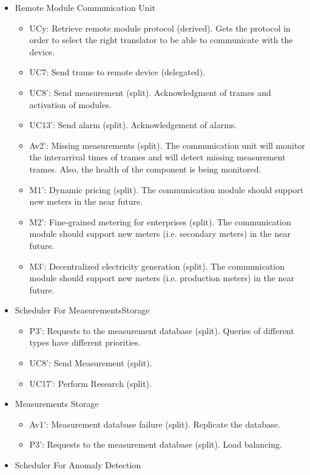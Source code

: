 \begin{itemize}
	\item Remote Module Communication Unit
	\begin{itemize}
	  	\item UCy: Retrieve remote module protocol (derived). Gets the protocol in
	  	order to select the right translator to be able to communicate with the device. 
		\item UC7: Send trame to remote device (delegated). 
		\item UC8': Send measurement (split). Acknowledgment of trames and activation
		of modules.
		\item UC13': Send alarm (split). Acknowledgement of alarms.
		\item Av2': Missing measurements (split). The communication unit will monitor
		the interarrival times of trames and will detect missing measurement trames.
		Also, the health of the component is being monitored.
		\item M1': Dynamic pricing (split). The communication module should support
		new meters in the near future. 
		\item M2': Fine-grained metering for enterprises (split). The communication
		module should support new meters (i.e. secondary meters) in the near future. 
		\item M3': Decentralized electricity generation (split). The communication
		module should support new meters (i.e. production meters) in the near future.
	\end{itemize}
	\item Scheduler For MeasurementsStorage
	\begin{itemize}
		\item P3': Requests to the measurement database (split). Queries of different
		types have different priorities.
		\item UC8': Send Measurement (split). 
		\item UC17': Perform Research (split). 
	\end{itemize}
	\item Measurements Storage
	\begin{itemize}
		\item Av1': Measurement database failure (split). Replicate the database.
	  	\item P3': Requests to the measurement database (split). Load balancing.
	\end{itemize}
	\item Scheduler For Anomaly Detection 
	\begin{itemize}

\end{itemize}
\end{itemize}
